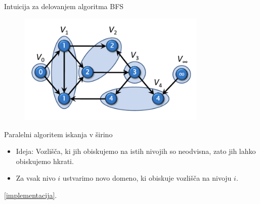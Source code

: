\documentclass{beamer}
\begin{document}
\begin{frame}{Intuicija za delovanjem algoritma BFS}
    \begin{figure}
        \centering
        \includegraphics[width=9cm]{slike/parallel_bfs/pbfs_graph_by_levels.png}
        \label{fig:pbfs_graph_example}
    \end{figure}
\end{frame}

\begin{frame}{Paralelni algoritem iskanja v širino}
    \begin{itemize}
        \item Ideja: Vozlišča, ki jih obiskujemo na istih nivojih so neodvisna, zato jih lahko obiskujemo hkrati.
        \item Za vsak nivo $i$ ustvarimo novo domeno, ki obiskuje vozlišča na nivoju $i$.
    \end{itemize}
    \href{https://github.com/tjazerzen/parallelisation-of-graph-algorithms-in-functional-programming-languages/blob/parallel_BFS/playground/graph/bfs.ml}{[implementacija]}.
\end{frame}
\end{document}
